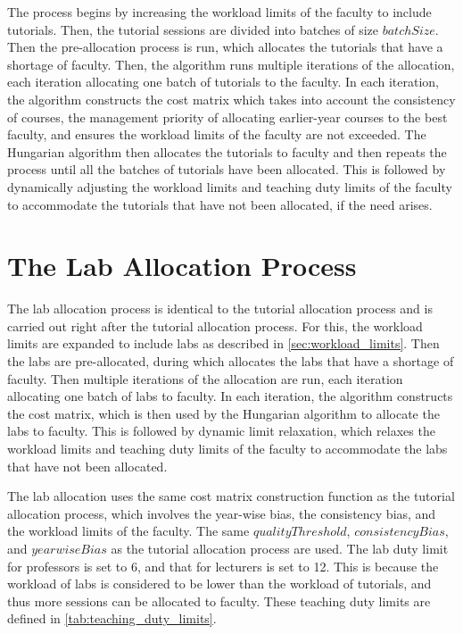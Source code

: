 The process begins by increasing the workload limits of the faculty to include tutorials. Then, the tutorial sessions are divided into batches of size $batchSize$. Then the pre-allocation process is run, which allocates the tutorials that have a shortage of faculty. Then, the algorithm runs multiple iterations of the allocation, each iteration allocating one batch of tutorials to the faculty. In each iteration, the algorithm constructs the cost matrix which takes into account the consistency of courses, the management priority of allocating earlier-year courses to the best faculty, and ensures the workload limits of the faculty are not exceeded. The Hungarian algorithm then allocates the tutorials to faculty and then repeats the process until all the batches of tutorials have been allocated. This is followed by dynamically adjusting the workload limits and teaching duty limits of the faculty to accommodate the tutorials that have not been allocated, if the need arises.

\section{The Lab Allocation Process}

The lab allocation process is identical to the tutorial allocation process and is carried out right after the tutorial allocation process. For this, the workload limits are expanded to include labs as described in \autoref{sec:workload_limits}. Then the labs are pre-allocated, during which allocates the labs that have a shortage of faculty. Then multiple iterations of the allocation are run, each iteration allocating one batch of labs to faculty. In each iteration, the algorithm constructs the cost matrix, which is then used by the Hungarian algorithm to allocate the labs to faculty. This is followed by dynamic limit relaxation, which relaxes the workload limits and teaching duty limits of the faculty to accommodate the labs that have not been allocated.

The lab allocation uses the same cost matrix construction function as the tutorial allocation process, which involves the year-wise bias, the consistency bias, and the workload limits of the faculty. The same $qualityThreshold$, $consistencyBias$, and $yearwiseBias$ as the tutorial allocation process are used. The lab duty limit for professors is set to 6, and that for lecturers is set to 12. This is because the workload of labs is considered to be lower than the workload of tutorials, and thus more sessions can be allocated to faculty. These teaching duty limits are defined in \autoref{tab:teaching_duty_limits}.

